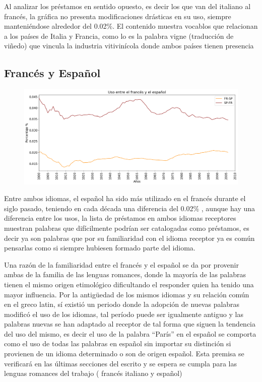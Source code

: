 Al analizar los préstamos en sentido opuesto, es decir los que van del italiano al francés,  la gráfica no presenta modificaciones drásticas en su uso,  siempre manteniéndose alrededor del 0.02$\%$. El contenido muestra vocablos que relacionan a los países de Italia y Francia, como lo es la palabra vigne  (traducción de viñedo) que vincula la industria vitivinícola donde ambos países tienen presencia

\newpage
\subsection{Francés y Español}


\begin{figure}[h!]
	\centering
	\includegraphics[scale=.38]{Cap_4/SF_4_S2_FR.png}
	\label{SF_FS}
	\caption{}
\end{figure}



Entre ambos idiomas, el español ha sido más utilizado en el francés durante el siglo pasado,  teniendo en cada década una diferencia del 0.02$\%$ , aunque hay una diferencia entre los usos, la lista de préstamos en ambos idiomas receptores muestran palabras que difícilmente podrían ser catalogadas como préstamos, es decir ya son palabras que por su familiaridad con el idioma receptor ya es común pensarlas como si siempre hubiesen formado parte del idioma.   

Una razón de la familiaridad entre el francés y el español se da por  provenir ambas de la familia de las lenguas romances, donde la mayoría de las palabras tienen el mismo origen etimológico dificultando el responder quien ha tenido una mayor influencia. Por la antigüedad de los mismos idiomas y su relación común en el greco latin, sí existió un periodo donde la adopción de nuevas palabras modificó el uso de los idiomas, tal período puede ser igualmente antiguo y las palabras nuevas se han adaptado al receptor de tal forma que siguen la tendencia del uso del mismo, es decir el uso de  la palabra “París” en el español se comporta como el uso de todas las palabras en español sin importar su distinción si provienen de un idioma determinado o son de origen español.  Esta premisa se verificará en las últimas secciones del escrito y se espera se cumpla para las lenguas romances del trabajo ( francés italiano y español)



